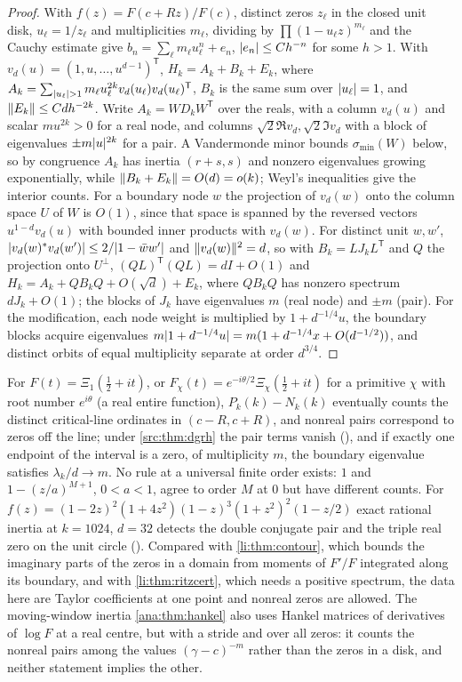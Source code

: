 \begin{proof}
With $f(z)=F(c+Rz)/F(c)$, distinct zeros $z_\ell$ in the closed unit disk, $u_\ell=1/z_\ell$ and
multiplicities $m_\ell$, dividing by $\prod(1-u_\ell z)^{m_\ell}$ and the Cauchy estimate give
$b_n=\sum_\ell m_\ell u_\ell^n+e_n$, $\lvert e_n\rvert\le Ch^{-n}$ for some $h>1$. With $v_d(u)=(1,u,\dots,u^{d-1})^{\mathsf T}$,
$H_k=A_k+B_k+E_k$, where $A_k=\sum_{\lvert u_\ell\rvert>1}m_\ell u_\ell^{2k}v_d(u_\ell)v_d(u_\ell)^{\mathsf T}$, $B_k$ is the
same sum over $\lvert u_\ell\rvert=1$, and $\lVert E_k\rVert\le Cdh^{-2k}$. Write $A_k=WD_kW^{\mathsf T}$ over the reals, with a
column $v_d(u)$ and scalar $mu^{2k}>0$ for a real node, and columns $\sqrt2\Re v_d,\sqrt2\Im v_d$ with a
block of eigenvalues $\pm m\lvert u\rvert^{2k}$ for a pair. A Vandermonde minor bounds $\sigma_{\min}(W)$ below, so
by congruence $A_k$ has inertia $(r+s,s)$ and nonzero eigenvalues growing exponentially, while
$\lVert B_k+E_k\rVert=O(d)=o(k)$; Weyl's inequalities give the interior counts. For a boundary node $w$ the
projection of $v_d(w)$ onto the column space $U$ of $W$ is $O(1)$, since that space is spanned by the
reversed vectors $u^{1-d}v_d(u)$ with bounded inner products with $v_d(w)$. For distinct unit $w,w'$,
$\lvert v_d(w)^*v_d(w')\rvert\le2/\lvert1-\bar ww'\rvert$ and $\lVert v_d(w)\rVert^2=d$, so with $B_k=LJ_kL^{\mathsf T}$ and $Q$ the
projection onto $U^\perp$, $(QL)^{\mathsf T}(QL)=dI+O(1)$ and $H_k=A_k+QB_kQ+O(\sqrt d)+E_k$, where $QB_kQ$ has
nonzero spectrum $dJ_k+O(1)$; the blocks of $J_k$ have eigenvalues $m$ (real node) and $\pm m$ (pair).
For the modification, each node weight is multiplied by $1+d^{-1/4}u$, the boundary blocks acquire
eigenvalues $m\lvert1+d^{-1/4}u\rvert=m(1+d^{-1/4}x+O(d^{-1/2}))$, and distinct orbits of equal multiplicity
separate at order $d^{3/4}$.
\end{proof}

For $F(t)=\Xi_1(\tfrac12+it)$, or $F_\chi(t)=e^{-i\theta/2}\Xi_\chi(\tfrac12+it)$ for a primitive $\chi$ with
root number $e^{i\theta}$ (a real entire function), $P_k(k)-N_k(k)$ eventually counts the distinct
critical-line ordinates in $(c-R,c+R)$, and nonreal pairs correspond to zeros off the line; under
\cref{src:thm:dgrh} the pair terms vanish (\stG), and if exactly one endpoint of the interval is a zero,
of multiplicity $m$, the boundary eigenvalue satisfies $\lambda_k/d\to m$. No rule at a universal
finite order exists: $1$ and $1-(z/a)^{M+1}$, $0<a<1$, agree to order $M$ at $0$ but have different counts.
For $f(z)=(1-2z)^2(1+4z^2)(1-z)^3(1+z^2)^2(1-z/2)$ exact rational inertia at $k=1024$, $d=32$
detects the double conjugate pair and the triple real zero on the unit circle
(). Compared with
\cref{li:thm:contour}, which bounds the imaginary parts of the zeros in a domain from moments of $F'/F$ integrated along its boundary, and
with \cref{li:thm:ritzcert}, which needs a positive spectrum, the data here are Taylor coefficients at
one point and nonreal zeros are allowed. The moving-window inertia \cref{ana:thm:hankel} also uses Hankel
matrices of derivatives of $\log F$ at a real centre, but with a stride and over all zeros: it counts the
nonreal pairs among the values $(\gamma-c)^{-m}$ rather than the zeros in a disk, and neither statement
implies the other.

